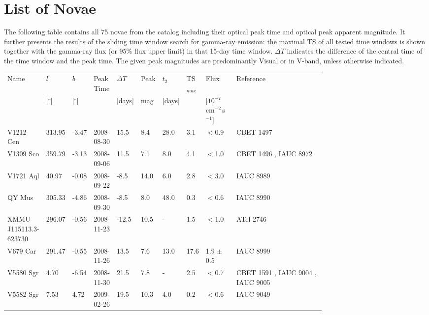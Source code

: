 \documentclass{aa} %
\begin{document}
\section{List of Novae}
\label{appendixA}
The following table contains all 75 novae from the catalog including their optical peak time and optical peak apparent magnitude. It further presents the results of the sliding time window search for gamma-ray emission: the maximal TS of all tested time windows is shown together with the gamma-ray flux (or 95\% flux upper limit) in that 15-day time window. $\Delta T$ indicates the difference of the central time of the time window and the peak time. The given peak magnitudes are predominantly Visual or in V-band, unless otherwise indicated.
\begin{landscape}
\begin{tiny}
\begin{longtable*}{ L{0.07\linewidth} p{0.03\linewidth}  p{0.04\linewidth} p{0.07\linewidth} p{0.03\linewidth} p{0.04\linewidth} p{0.04\linewidth} p{0.03\linewidth} p{0.1\linewidth}  L{0.3\linewidth} }
\hline
\hline
Name & $l$     & $b$         & Peak Time &$\Delta T$  & Peak & $t_2$  & TS$_{max}$ & Flux                             & Reference\\
     & [$^\circ$] & [$^\circ$] &           & [days]     &  mag & [days] &    & [$10^{-7}$\,cm$^{-2}\,$s$^{-1}$] & \\
\hline
V1212 Cen & 313.95 & -3.47 & 2008-08-30 & 15.5 & 8.4 & 28.0 & 3.1 & $<$0.9 & CBET 1497 \citep{CBET1497}\\
V1309 Sco & 359.79 & -3.13 & 2008-09-06 & 11.5 & 7.1 & 8.0 & 4.1 & $<$1.0 & CBET 1496 \citep{CBET1496}, IAUC 8972 \citep{IAUC8972}\\
V1721 Aql & 40.97 & -0.08 & 2008-09-22 & -8.5 & 14.0 & 6.0 & 2.8 & $<$3.0 & IAUC 8989 \citep{IAUC8989}\\
QY Mus & 305.33 & -4.86 & 2008-09-30 & -8.5 & 8.0 & 48.0 & 0.3 & $<$0.6 & IAUC 8990 \citep{IAUC8990}\\
XMMU J115113.3-623730 & 296.07 & -0.56 & 2008-11-23 & -12.5 & 10.5 & - & 1.5 & $<$1.0 & ATel 2746 \citep{ATel2746}\\
V679 Car & 291.47 & -0.55 & 2008-11-26 & 13.5 & 7.6 & 13.0 & 17.6 & 1.9 $\pm$ 0.5 & IAUC 8999 \citep{IAUC8999}\\
V5580 Sgr & 4.70 & -6.54 & 2008-11-30 & 21.5 & 7.8 & - & 2.5 & $<$0.7 & CBET 1591 \citep{CBET1591}, IAUC 9004 \citep{IAUC9004}, IAUC 9005 \citep{IAUC9005}\\
V5582 Sgr & 7.53 & 4.72 & 2009-02-26 & 19.5 & 10.3 & 4.0 & 0.2 & $<$0.6 & IAUC 9049 \citep{IAUC9049}\\

\end{longtable*}
\end{tiny}
\end{landscape}
\end{document}
